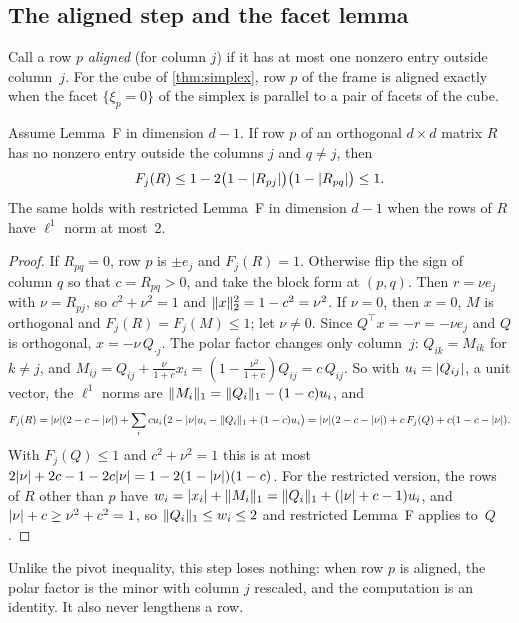 \documentclass[11pt,a4paper]{article}
\newcommand{\status}[1]{\textsf{\small[#1]}}
\begin{document}
\subsection{The aligned step and the facet lemma}
Call a row $p$ \emph{aligned} (for column $j$) if it has at most one nonzero entry outside column~$j$. For the cube of \cref{thm:simplex}, row $p$ of the frame is aligned exactly when the facet $\{\xi_p=0\}$ of the simplex is parallel to a pair of facets of the cube.

\begin{theorem}[aligned step; \status{Lean}]\label{thm:aligned}
Assume Lemma~F in dimension $d-1$. If row $p$ of an orthogonal $d\times d$ matrix $R$ has no nonzero entry outside the columns $j$ and $q\ne j$, then
\[
F_j(R)\le 1-2\bigl(1-\lvert R_{pj}\rvert\bigr)\bigl(1-\lvert R_{pq}\rvert\bigr)\le1.
\]
The same holds with restricted Lemma~F in dimension $d-1$ when the rows of $R$ have $\ell^1$ norm at most~$2$.
\end{theorem}
\begin{proof}
If $R_{pq}=0$, row $p$ is $\pm e_j$ and $F_j(R)=1$. Otherwise flip the sign of column $q$ so that $c=R_{pq}>0$, and take the block form at $(p,q)$. Then $r=\nu e_j$ with $\nu=R_{pj}$, so $c^2+\nu^2=1$ and $\lVert x\rVert_2^2=1-c^2=\nu^2$. If $\nu=0$, then $x=0$, $M$ is orthogonal and $F_j(R)=F_j(M)\le1$; let $\nu\ne0$. Since $Q^\top x=-r=-\nu e_j$ and $Q$ is orthogonal, $x=-\nu\,Q_{\cdot j}$. The polar factor changes only column~$j$: $Q_{ik}=M_{ik}$ for $k\ne j$, and $M_{ij}=Q_{ij}+\frac{\nu}{1+c}x_i=(1-\frac{\nu^2}{1+c})Q_{ij}=c\,Q_{ij}$. So with $u_i=\lvert Q_{ij}\rvert$, a unit vector, the $\ell^1$ norms are $\lVert M_i\rVert_1=\lVert Q_i\rVert_1-(1-c)u_i$, and
\[
F_j(R)=\lvert \nu\rvert(2-c-\lvert \nu\rvert)+\sum_icu_i\bigl(2-\lvert \nu\rvert u_i-\lVert Q_i\rVert_1+(1-c)u_i\bigr)
=\lvert \nu\rvert(2-c-\lvert \nu\rvert)+c\,F_j(Q)+c(1-c-\lvert \nu\rvert).
\]
With $F_j(Q)\le1$ and $c^2+\nu^2=1$ this is at most $2\lvert \nu\rvert+2c-1-2c\lvert \nu\rvert=1-2(1-\lvert \nu\rvert)(1-c)$. For the restricted version, the rows of $R$ other than $p$ have $w_i=\lvert x_i\rvert+\lVert M_i\rVert_1=\lVert Q_i\rVert_1+(\lvert \nu\rvert+c-1)u_i$, and $\lvert \nu\rvert+c\ge\nu^2+c^2=1$, so $\lVert Q_i\rVert_1\le w_i\le2$ and restricted Lemma~F applies to~$Q$.
\end{proof}

Unlike the pivot inequality, this step loses nothing: when row $p$ is aligned, the polar factor is the minor with column $j$ rescaled, and the computation is an identity. It also never lengthens a row.
\end{document}
